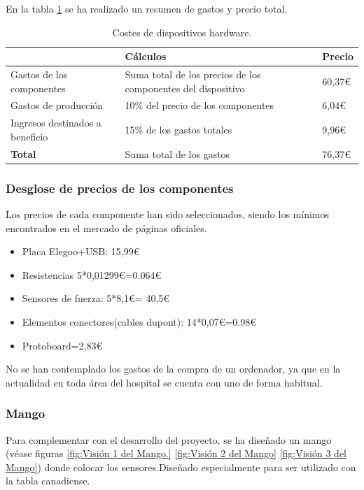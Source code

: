 En la tabla \ref{tab:costes_hardware} se ha realizado un resumen de gastos y precio total. 
\begin{table}[]
\centering
\begin{tabular}{|l|p{8cm}|l|}
\hline
\rowcolor[HTML]{BFBFBF} 
\textbf{} & \textbf{Cálculos} & \textbf{Precio} \\ \hline
Gastos de los componentes & Suma total de los precios de los componentes del dispositivo & 60,37€\\ \hline
Gastos de producción & 10\% del precio de los
 componentes & 6,04€\\ \hline
Ingresos destinados a beneficio & 15\% de los gastos totales & 9,96€\\ \hline
\textbf{Total}& Suma total de los gastos & 76,37€ \\ \hline
\end{tabular}
\caption{Costes de dispositivos hardware.}
\label{tab:costes_hardware}
\end{table}

\subsubsection{\textbf{Desglose de precios de los componentes}}
Los precios de cada componente han sido seleccionados, siendo los mínimos encontrados en el mercado de páginas oficiales.
\begin{itemize}
    \item Placa Elegoo+USB: 15,99€
    \item Resistencias 5*0,01299€=0.064€
    \item Sensores de fuerza: 5*8,1€= 40,5€
    \item Elementos conectores(cables dupont): 14*0,07€=0.98€
    \item Protoboard=2,83€
\end{itemize}
No se han contemplado los gastos de la compra de un ordenador, ya que en la actualidad en toda área del hospital se cuenta con uno de forma habitual. 

\subsubsection{Mango}

Para complementar con el desarrollo del proyecto, se ha diseñado un mango (véase figuras \ref{fig:Visión 1 del Mango.} \ref{fig:Visión 2 del Mango} \ref{fig:Visión 3 del Mango}) donde colocar los sensores.Diseñado especialmente para ser utilizado con la tabla canadiense. 


